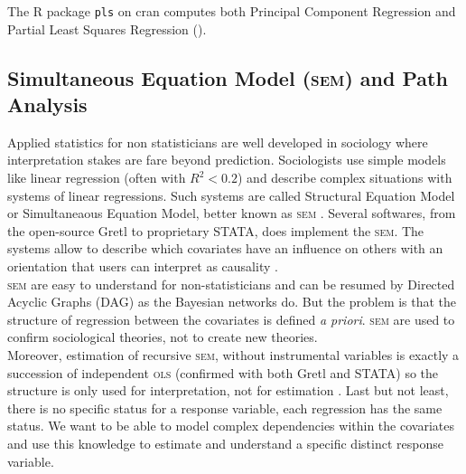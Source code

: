 \documentclass[12pt,a4paper]{report}
\begin{document}
%	
%	
	
	The R package {\tt pls} on {\sc cran} computes both Principal Component Regression and Partial Least Squares Regression (\cite{packagepls}).
		\subsection{Simultaneous Equation Model (\textsc{sem}) and Path Analysis}		%
		Applied statistics  for non statisticians are well developed in sociology where interpretation  stakes are fare beyond prediction. Sociologists use simple models like linear regression (often with $R^2<0.2$) and describe complex situations with systems of linear regressions. Such systems are called Structural Equation Model or Simultaneaous Equation Model, better known as \textsc{sem} \cite{davidson1993estimation}. Several softwares, from the open-source Gretl \cite{CottrellLucchetti2007gretlmanual} to proprietary STATA, does implement the \textsc{sem}. The systems allow to describe which covariates have an influence on others with an orientation that users can interpret as causality \cite{pearl2000causality,pearl1998graphs}. \\
		
		\textsc{sem} are easy to understand for non-statisticians and can be resumed by Directed Acyclic Graphs (DAG) as the Bayesian networks do. But the problem is that the structure of regression between the covariates is defined {\it a priori}. \textsc{sem} are used to confirm sociological theories, not to create new theories. \\
		
		Moreover, estimation of recursive \textsc{sem}, without instrumental variables is exactly a succession of independent \textsc{ols} (confirmed with both Gretl and STATA) so the structure is only used for interpretation, not for estimation \cite{brito2006graphical}. Last but not least, there is no specific status for a response variable, each regression has the same status. We want to be able to model complex dependencies within the covariates and use this knowledge to estimate and understand a specific distinct response variable.
\end{document}
